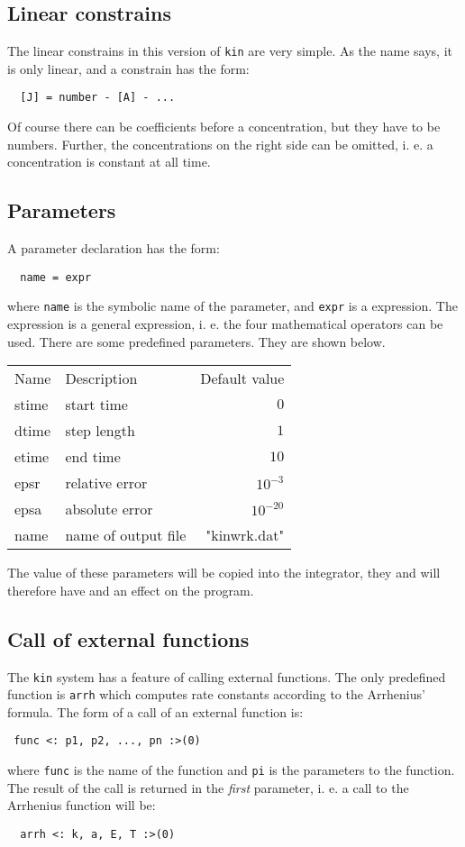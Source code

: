 \subsection{Linear constrains}
The linear constrains in this version of {\tt kin} are very simple. As the name says, it is only
linear, and a constrain has the form:
\begin{verbatim}
  [J] = number - [A] - ...
\end{verbatim}
Of course there can be coefficients before a concentration, but they have to be numbers. 
Further, the concentrations on the right side can be omitted, i. e.
a concentration is constant at all time.

\subsection{Parameters}
A parameter declaration has the form:
\begin{verbatim}
  name = expr
\end{verbatim}
where {\tt name} is the symbolic name of the parameter, and {\tt expr} is a expression. The expression
is a general expression, i. e. the four mathematical operators can be used. There are some predefined
parameters. They are shown below.

\begin{tabular}{llr}
 Name   & Description    & Default value \\ 
 stime  & start time     & $0$ \\ 
 dtime  & step length    & $1$ \\
 etime  & end time       & $10$ \\
 epsr   & relative error & $10^{-3}$ \\
 epsa   & absolute error & $10^{-20}$ \\
 name   & name of output file & "kinwrk.dat" 
\end{tabular}

The value of these parameters will be copied into the integrator, they and will therefore have
and an effect on the program.

\subsection{Call of external functions}
The {\tt kin} system has a feature of calling external functions. The only 
predefined function is {\tt arrh} which computes rate constants according
to the Arrhenius' formula. The form of a call of an external function is:
\begin{verbatim}
 func <: p1, p2, ..., pn :>(0)
\end{verbatim}
where {\tt func} is the name of the function and {\tt pi} is the parameters
to the function. The result of the call is returned in the {\em first}
parameter, i. e. a call to the Arrhenius function will be:
\begin{verbatim}
  arrh <: k, a, E, T :>(0)
\end{verbatim}

